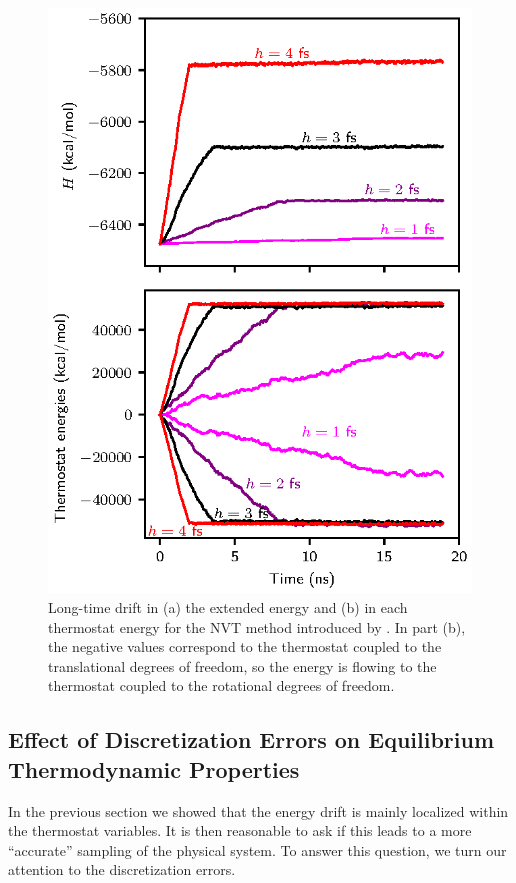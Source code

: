 \documentclass[
journal=jctcce,
layout=twocolumn
]{achemso}
\begin{document}
\begin{figure}
	\includegraphics{Figures/numerical_stability.eps}
    \caption{Long-time drift in (a) the extended energy and (b) in each thermostat energy for the NVT method introduced by \citeauthor{Kamberaj_2005} \cite{Kamberaj_2005}. In part (b), the negative values correspond to the thermostat coupled to the translational degrees of freedom, so the energy is flowing to the thermostat coupled to the rotational degrees of freedom.}
	\label{fig:num_stab}
\end{figure}

\subsection*{Effect of Discretization Errors on Equilibrium Thermodynamic Properties}

In the previous section we showed that the energy drift is mainly localized within the thermostat variables.
It is then reasonable to ask if this leads to a more ``accurate'' sampling of the physical system.
To answer this question, we turn our attention to the discretization errors.
\end{document}
